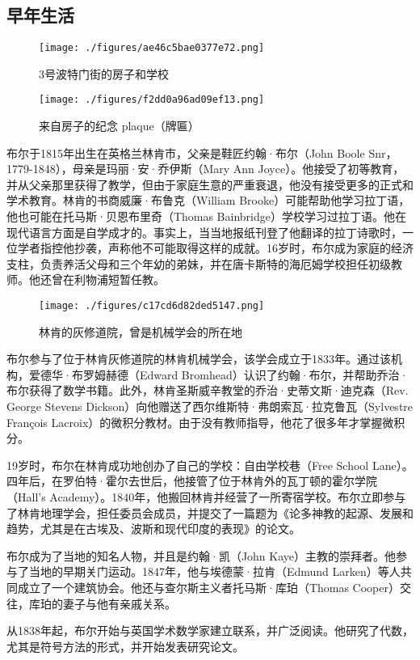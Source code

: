 \subsection{早年生活}
\begin{figure}[ht]
\centering
\texttt{[image: ./figures/ae46c5bae0377e72.png]}
\caption{3号波特门街的房子和学校} \label{fig_George_2}
\end{figure}
\begin{figure}[ht]
\centering
\texttt{[image: ./figures/f2dd0a96ad09ef13.png]}
\caption{来自房子的纪念 plaque（牌匾）} \label{fig_George_3}
\end{figure}
布尔于1815年出生在英格兰林肯市，父亲是鞋匠约翰·布尔（John Boole Snr，1779-1848），母亲是玛丽·安·乔伊斯（Mary Ann Joyce）。他接受了初等教育，并从父亲那里获得了教学，但由于家庭生意的严重衰退，他没有接受更多的正式和学术教育。林肯的书商威廉·布鲁克（William Brooke）可能帮助他学习拉丁语，他也可能在托马斯·贝恩布里奇（Thomas Bainbridge）学校学习过拉丁语。他在现代语言方面是自学成才的。事实上，当当地报纸刊登了他翻译的拉丁诗歌时，一位学者指控他抄袭，声称他不可能取得这样的成就。16岁时，布尔成为家庭的经济支柱，负责养活父母和三个年幼的弟妹，并在唐卡斯特的海厄姆学校担任初级教师。他还曾在利物浦短暂任教。
\begin{figure}[ht]
\centering
\texttt{[image: ./figures/c17cd6d82ded5147.png]}
\caption{林肯的灰修道院，曾是机械学会的所在地} \label{fig_George_4}
\end{figure}
布尔参与了位于林肯灰修道院的林肯机械学会，该学会成立于1833年。通过该机构，爱德华·布罗姆赫德（Edward Bromhead）认识了约翰·布尔，并帮助乔治·布尔获得了数学书籍。此外，林肯圣斯威辛教堂的乔治·史蒂文斯·迪克森（Rev. George Stevens Dickson）向他赠送了西尔维斯特·弗朗索瓦·拉克鲁瓦（Sylvestre François Lacroix）的微积分教材。由于没有教师指导，他花了很多年才掌握微积分。

19岁时，布尔在林肯成功地创办了自己的学校：自由学校巷（Free School Lane）。四年后，在罗伯特·霍尔去世后，他接管了位于林肯外的瓦丁顿的霍尔学院（Hall's Academy）。1840年，他搬回林肯并经营了一所寄宿学校。布尔立即参与了林肯地理学会，担任委员会成员，并提交了一篇题为《论多神教的起源、发展和趋势，尤其是在古埃及、波斯和现代印度的表现》的论文。

布尔成为了当地的知名人物，并且是约翰·凯（John Kaye）主教的崇拜者。他参与了当地的早期关门运动。1847年，他与埃德蒙·拉肯（Edmund Larken）等人共同成立了一个建筑协会。他还与查尔斯主义者托马斯·库珀（Thomas Cooper）交往，库珀的妻子与他有亲戚关系。

从1838年起，布尔开始与英国学术数学家建立联系，并广泛阅读。他研究了代数，尤其是符号方法的形式，并开始发表研究论文。

